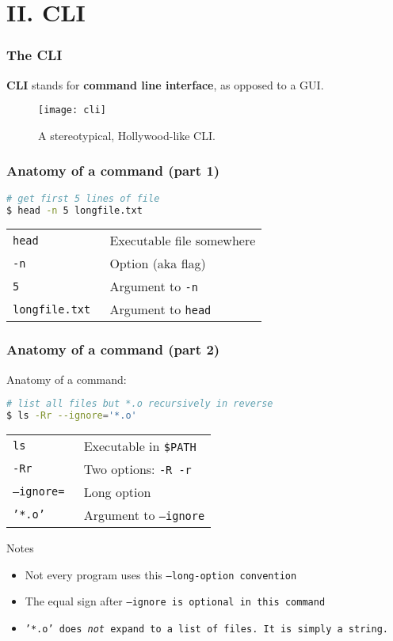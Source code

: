 \section{II. CLI}
\begin{frame}
\frametitle{The CLI}
\textbf{CLI} stands for \textbf{command line interface}, as opposed to a GUI.

\begin{figure}[h]
    \centering
    \texttt{[image: cli]}
    \caption{A stereotypical, Hollywood-like CLI.}
\end{figure}
\end{frame}

\begin{frame}[fragile]
\frametitle{Anatomy of a command (part 1)}
\begin{lstlisting}[language=bash]
# get first 5 lines of file
$ head -n 5 longfile.txt
\end{lstlisting}
\begin{tabular}{ll}
    \tt{head}            & Executable file somewhere \\
    \tt{-n}                & Option (aka flag) \\
    \tt{5}                & Argument to \tt{-n} \\
    \tt{longfile.txt}    & Argument to \tt{head}
\end{tabular}
\end{frame}

\begin{frame}[fragile]
\frametitle{Anatomy of a command (part 2)}
Anatomy of a command:
\begin{lstlisting}[language=bash]
# list all files but *.o recursively in reverse
$ ls -Rr --ignore='*.o'
\end{lstlisting}
\begin{tabular}{ll}
    \tt{ls}            & Executable in \tt{\$PATH} \\
    \tt{-Rr}        & Two options: \tt{-R -r} \\
    \tt{--ignore=}    & Long option \\
    \tt{'*.o'}        & Argument to \tt{--ignore}
\end{tabular}
\begin{block}{Notes}
    \begin{itemize}
        \item Not every program uses this \tt{--long-option} convention
        \item The equal sign after \tt{--ignore} is optional in this command
        \item \tt{'*.o'} does \textit{not} expand to a list of files.
            It is simply a string.
    \end{itemize}
\end{block}
\end{frame}


